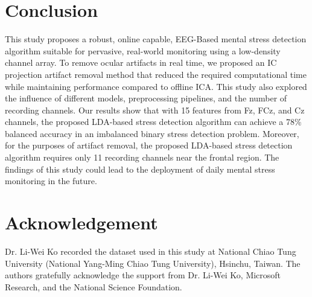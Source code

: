 \documentclass[journal]{IEEEtran}
\begin{document}
\section{Conclusion}
This study proposes a robust, online capable, EEG-Based mental stress detection algorithm suitable for pervasive, real-world monitoring using a low-density channel array.
To remove ocular artifacts in real time, we proposed an IC projection artifact removal method that reduced the required computational time while maintaining performance compared to offline ICA.
This study also explored the influence of different models, preprocessing pipelines, and the number of recording channels.
Our results show that with 15 features from Fz, FCz, and Cz channels, the proposed LDA-based stress detection algorithm can achieve a 78\% balanced accuracy in an imbalanced binary stress detection problem.
Moreover, for the purposes of artifact removal, the proposed LDA-based stress detection algorithm requires only 11 recording channels near the frontal region.
The findings of this study could lead to the deployment of daily mental stress monitoring in the future. 

\section{Acknowledgement}
Dr. Li-Wei Ko recorded the dataset used in this study at National Chiao Tung University (National Yang-Ming Chiao Tung University), Hsinchu, Taiwan.
The authors gratefully acknowledge the support from Dr. Li-Wei Ko, Microsoft Research, and the National Science Foundation.





\end{document}
